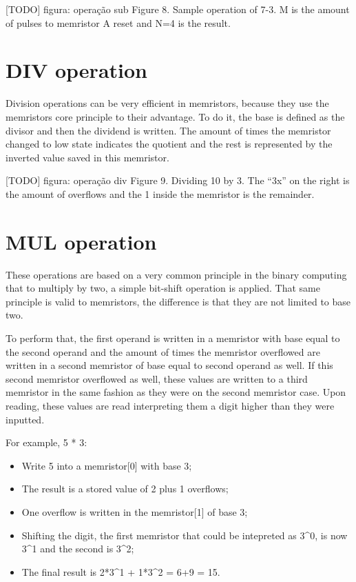 \documentclass[ecp,tc,english]{iiufrgs}
\begin{document}
[TODO] figura: operação sub
Figure 8. Sample operation of 7-3. M is the amount of pulses to memristor A reset and N=4 is the result.

\section{DIV operation}

Division operations can be very efficient in memristors, because they use the memristors core principle to their advantage. To do it, the base is defined as the divisor and then the dividend is written. The amount of times the memristor changed to low state indicates the quotient and the rest is represented by the inverted value saved in this memristor.

[TODO] figura: operação div
Figure 9. Dividing 10 by 3. The “3x” on the right is the amount of overflows and the 1 inside the memristor is the remainder.

\section{MUL operation}

These operations are based on a very common principle in the binary computing that to multiply by two, a simple bit-shift operation is applied. That same principle is valid to memristors, the difference is that they are not limited to base two.

To perform that, the first operand is written in a memristor with base equal to the second operand and the amount of times the memristor overflowed are written in a second memristor of base equal to second operand as well. If this second memristor overflowed as well, these values are written to a third memristor in the same fashion as they were on the second memristor case. Upon reading, these values are read interpreting them a digit higher than they were inputted.

For example, 5 * 3:

\begin{itemize}
    \item Write 5 into a memristor[0] with base 3;
    \item The result is a stored value of 2 plus 1 overflows;
    \item One overflow is written in the memristor[1] of base 3;
    \item Shifting the digit, the first memristor that could be intepreted as 3^0, is now 3^1 and the second is 3^2;
    \item The final result is 2*3^1 + 1*3^2 = 6+9 = 15.
\end{itemize}
\end{document}
